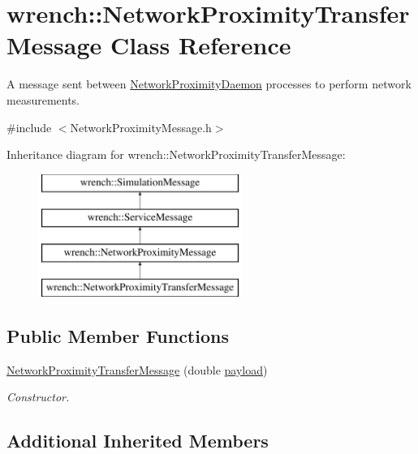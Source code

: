 \hypertarget{classwrench_1_1_network_proximity_transfer_message}{}\section{wrench\+:\+:Network\+Proximity\+Transfer\+Message Class Reference}
\label{classwrench_1_1_network_proximity_transfer_message}


A message sent between \hyperlink{classwrench_1_1_network_proximity_daemon}{Network\+Proximity\+Daemon} processes to perform network measurements.  




{\ttfamily \#include $<$Network\+Proximity\+Message.\+h$>$}

Inheritance diagram for wrench\+:\+:Network\+Proximity\+Transfer\+Message\+:\begin{figure}[H]
\begin{center}
\leavevmode
\includegraphics[height=4.000000cm]{classwrench_1_1_network_proximity_transfer_message}
\end{center}
\end{figure}
\subsection*{Public Member Functions}
\begin{DoxyCompactItemize}
\item 
\hyperlink{classwrench_1_1_network_proximity_transfer_message_aca8f39006124db8bf6c06a7f27873ae0}{Network\+Proximity\+Transfer\+Message} (double \hyperlink{classwrench_1_1_simulation_message_a914f2732713f7c02898e66f05a7cb8a1}{payload})
\begin{DoxyCompactList}\small\item\em Constructor. \end{DoxyCompactList}\end{DoxyCompactItemize}
\subsection*{Additional Inherited Members}


